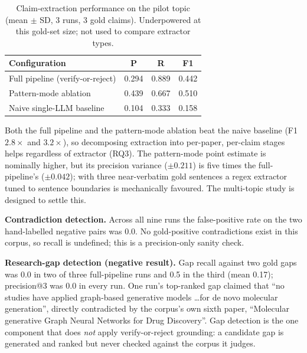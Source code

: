 \documentclass[conference]{IEEEtran}
\begin{document}
\begin{table}[t]
\centering
\caption{Claim-extraction performance on the pilot topic (mean $\pm$ SD, 3 runs,
3 gold claims). Underpowered at this gold-set size; not used to compare extractor
types.}
\label{tab:claims}
\begin{tabular}{@{}lccc@{}}
\toprule
Configuration & P & R & F1 \\
\midrule
Full pipeline (verify-or-reject) & 0.294 & 0.889 & 0.442 \\
Pattern-mode ablation & 0.439 & 0.667 & 0.510 \\
Naive single-LLM baseline & 0.104 & 0.333 & 0.158 \\
\bottomrule
\end{tabular}
\end{table}

Both the full pipeline and the pattern-mode ablation beat the naive baseline
(F1 $2.8\times$ and $3.2\times$), so decomposing extraction into per-paper,
per-claim stages helps regardless of extractor (RQ3). The pattern-mode point
estimate is nominally higher, but its precision variance ($\pm 0.211$) is five
times the full-pipeline's ($\pm 0.042$); with three near-verbatim gold sentences
a regex extractor tuned to sentence boundaries is mechanically favoured. The
multi-topic study is designed to settle this.

\textbf{Contradiction detection.} Across all nine runs the false-positive rate on
the two hand-labelled negative pairs was 0.0. No gold-positive contradictions
exist in this corpus, so recall is undefined; this is a precision-only sanity
check.

\textbf{Research-gap detection (negative result).} Gap recall against two gold
gaps was 0.0 in two of three full-pipeline runs and 0.5 in the third (mean 0.17);
precision@3 was 0.0 in every run. One run's top-ranked gap claimed that ``no
studies have applied graph-based generative models \ldots for de novo molecular
generation'', directly contradicted by the corpus's own sixth paper, ``Molecular
generative Graph Neural Networks for Drug Discovery''. Gap detection is the one
component that does \emph{not} apply verify-or-reject grounding: a candidate gap
is generated and ranked but never checked against the corpus it judges.
\end{document}
